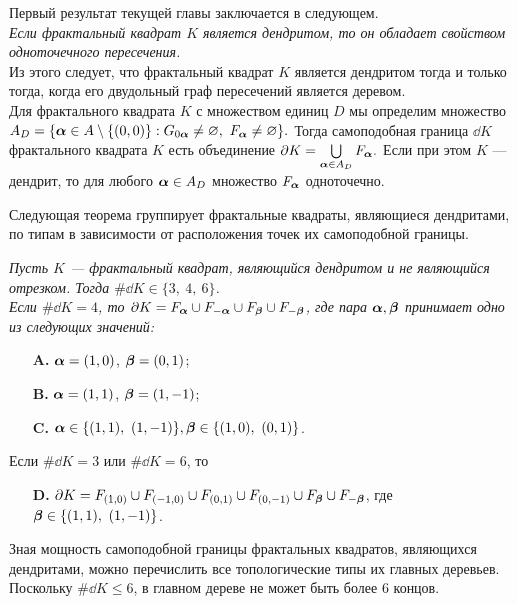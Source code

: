 Первый результат текущей главы заключается в следующем.\\

{\em Если фрактальный квадрат $K$ является дендритом, то он обладает свойством одноточечного пересечения.}\\

Из этого следует, что фрактальный квадрат $K$ является дендритом тогда и только тогда, когда его двудольный граф пересечений является деревом.\\
 
Для фрактального квадрата $K$ с множеством единиц $D$ мы определим множество 
$A_D=\{{\bm{\alpha}}\in A\setminus\{(0,0)\}: G_{0{\bm{\alpha}}}\neq\varnothing,\ F_{\bm{\alpha}}\neq\varnothing\}.$
Тогда самоподобная граница $\dd K$ фрактального квадрата $K$ есть объединение
$\partial K=\bigcup\limits_{{\bm{\alpha}}\in A_D}F_{\bm{\alpha}}.$
Если при этом $K$ --- дендрит, то для любого ${\bm{\alpha}}\in A_D$ множество $F_{\bm{\alpha}}$ одноточечно.

Следующая теорема группирует фрактальные квадраты, являющиеся дендритами, по типам в зависимости от расположения точек их самоподобной границы.\\

{\em Пусть $K$ --- фрактальный квадрат, являющийся дендритом и не являющийся отрезком.
Тогда $\#\dd K\in\{3,\ 4,\ 6\}$. \\
Если $\#\dd K=4$, то  $\partial K=F_{\bm{\alpha}}\cup F_{-{\bm{\alpha}}}\cup F_{\bm{\beta}}\cup F_{-{\bm{\beta}}}$, где   пара  ${\bm{\alpha}},{\bm{\beta}}$ принимает одно из следующих значений:
	\begin{itemize}[nolistsep]
	\item[{\bf A.}] ${\bm{\alpha}}=(1,0)$, $ {\bm{\beta}}=(0,1)$;
	\item[{\bf B.}] ${\bm{\alpha}}=(1,1)$, $ {\bm{\beta}}=(1,-1)$;
	\item[{\bf C.}] $\bma\in\{(1,1),\ (1,-1)\},\bmb\in\{(1,0),\ (0,1)\}$.
	\end{itemize}
Если $\#\dd K=3$ или $\#\dd K=6$, то 
\begin{itemize}[nolistsep]
	\item[{\bf D.}] $\partial K=F_{(1,0)}\cup F_{(-1,0)}\cup F_{(0,1)}\cup F_{(0,-1)}\cup F_{\bm{\beta}}\cup F_{-{\bm{\beta}}}$, где ${\bm{\beta}}\in\{(1,1),\ (1,-1)\}$.
\end{itemize}\quad}

Зная мощность самоподобной границы фрактальных квадратов, являющихся дендритами, можно перечислить все топологические типы их главных деревьев.
Поскольку $\#\dd K\leq6$, в главном дереве не может быть более 6 концов.

